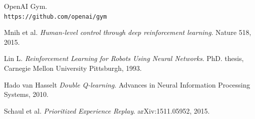 \documentclass{article}
\begin{document}
\begin{thebibliography}{9}

OpenAI Gym.
\\\texttt{https://github.com/openai/gym}

Mnih et al.
\textit{Human-level control through deep reinforcement learning}. 
Nature 518, 2015.

Lin L.
\textit{Reinforcement Learning for Robots Using Neural Networks}. 
PhD. thesis, Carnegie Mellon University Pittsburgh, 1993.

Hado van Hasselt
\textit{Double Q-learning}.
Advances in Neural Information Processing Systems, 2010.

Schaul et al.
\textit{Prioritized Experience Replay}.
arXiv:1511.05952, 2015.

\end{thebibliography}
\end{document}
